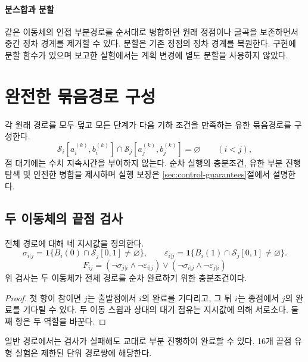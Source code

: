\documentclass[11pt,a4paper]{article}
\theoremstyle{remark}
\newcommand{\Sw}{\mathcal S}
\begin{document}
\paragraph{분스합과 분할}
같은 이동체의 인접 부분경로를 순서대로 병합하면 원래 정점이나 굴곡을 보존하면서 중간 정차 경계를 제거할 수 있다. 분할은 기존 정점의 정차 경계를 복원한다. 구현에 분할 함수가 있으며 보고한 실험에서는 계획 변경에 별도 분할을 사용하지 않았다.

\section{완전한 묶음경로 구성}
\label{sec:construction}
각 원래 경로를 모두 덮고 모든 단계가 다음 기하 조건을 만족하는 유한 묶음경로를 구성한다.
\begin{equation}
 \Sw_i[a_i^{(k)},b_i^{(k)}]\cap
 \Sw_j[a_j^{(k)},b_j^{(k)}]=\varnothing\qquad(i<j),
 \label{eq:stage-safe}
\end{equation}
점 대기에는 수치 지속시간을 부여하지 않는다. 순차 실행의 충분조건, 유한 부분 진행 탐색 및 안전한 병합을 제시하며 실행 보장은 \ref{sec:control-guarantees}절에서 설명한다.

\subsection{두 이동체의 끝점 검사}
전체 경로에 대해 네 지시값을 정의한다.
\begin{equation}
 \sigma_{i|j}=\mathbf1\{B_i(0)\cap\Sw_j[0,1]\ne\varnothing\},\qquad
 \varepsilon_{i|j}=\mathbf1\{B_i(1)\cap\Sw_j[0,1]\ne\varnothing\}.
 \label{eq:flags}
\end{equation}
\begin{equation}
 F_{ij}=(\neg\sigma_{j|i}\land\neg\varepsilon_{i|j})
       \lor(\neg\sigma_{i|j}\land\neg\varepsilon_{j|i})
 \label{eq:pair-test}
\end{equation}
위 검사는 두 이동체가 전체 경로를 순차 완료하기 위한 충분조건이다.
\begin{proof}
첫 항이 참이면 $j$는 출발점에서 $i$의 완료를 기다리고, 그 뒤 $i$는 종점에서 $j$의 완료를 기다릴 수 있다. 두 이동 스윕과 상대의 대기 점유는 지시값에 의해 서로소다. 둘째 항은 두 역할을 바꾼다.
\end{proof}
일반 경로에서는 검사가 실패해도 교대로 부분 진행하여 완료할 수 있다. 16개 끝점 유형 실험은 제한된 단위 경로쌍에 해당한다.
\end{document}
